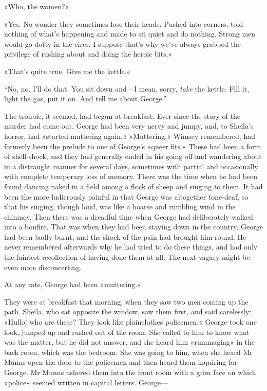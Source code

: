 »Who, the women?«

»Yes. No wonder they sometimes lose their heads. Pushed into corners, told nothing of what's happening and made to sit quiet and do nothing. Strong men would go dotty in the circs. I suppose that's why we've always grabbed the privilege of rushing about and doing the heroic bits.«

»That's quite true. Give me the kettle.«

\enquote{No, no. I'll do that. You sit down and\allowbreak---\allowbreak I mean, sorry, \textit{take} the kettle. Fill it, light the gas, put it on. And tell me about George.}

The trouble, it seemed, had begun at breakfast. Ever since the story of the murder had come out, George had been very nervy and jumpy, and, to Sheila's horror, had »started muttering again.« »Muttering,« Wimsey remembered, had formerly been the prelude to one of George's »queer fits.« These had been a form of shell-shock, and they had generally ended in his going off and wandering about in a distraught manner for several days, sometimes with partial and occasionally with complete temporary loss of memory. There was the time when he had been found dancing naked in a field among a flock of sheep and singing to them. It had been the more ludicrously painful in that George was altogether tone-deaf, so that his singing, though loud, was like a hoarse and rumbling wind in the chimney. Then there was a dreadful time when George had deliberately walked into a bonfire. That was when they had been staying down in the country. George had been badly burnt, and the shock of the pain had brought him round. He never remembered afterwards why he had tried to do these things, and had only the faintest recollection of having done them at all. The next vagary might be even more disconcerting.

At any rate, George had been »muttering.«

They were at breakfast that morning, when they saw two men coming up the path. Sheila, who sat opposite the window, saw them first, and said carelessly: »Hullo! who are these? They look like plainclothes policemen.« George took one look, jumped up and rushed out of the room. She called to him to know what was the matter, but he did not answer, and she heard him »rummaging« in the back room, which was the bedroom. She was going to him, when she heard Mr Munns open the door to the policemen and then heard them inquiring for George. Mr Munns ushered them into the front room with a grim face on which »police« seemed written in capital letters. George---


